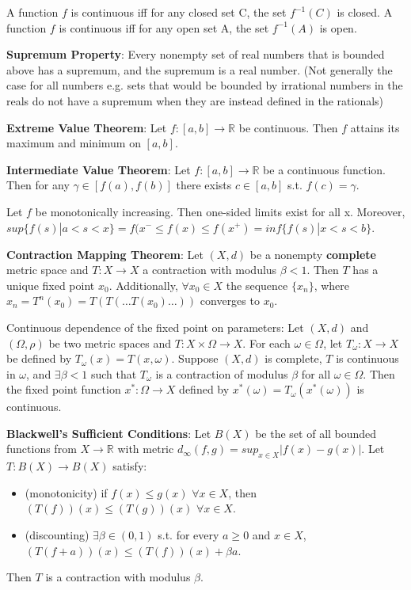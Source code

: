 \documentclass[11pt]{article} %
\begin{document}
A function $f$ is continuous iff for any closed set C, the set $f^{-1}(C)$ is closed. A function $f$ is continuous iff for any open set A, the set $f^{-1}(A)$ is open.

\textbf{Supremum Property}: Every nonempty set of real numbers that is bounded above has a supremum, and the supremum is a real number. (Not generally the case for all numbers e.g. sets that would be bounded by irrational numbers in the reals do not have a supremum when they are instead defined in the rationals)

\textbf{Extreme Value Theorem}: Let $f:[a,b]\rightarrow \mathbb{R}$ be continuous. Then $f$ attains its maximum and minimum on $[a,b]$.

\textbf{Intermediate Value Theorem}: Let $f:[a,b]\rightarrow \mathbb{R}$ be a continuous function. Then for any $\gamma \in [f(a),f(b)]$ there exists $c \in [a,b]$ s.t. $f(c) = \gamma$.

Let $f$ be monotonically increasing. Then one-sided limits exist for all x. Moreover, $sup\{f(s)|a<s<x\} = f(x^{-} \leq f(x) \leq f(x^{+}) = inf\{ f(s)|x<s<b\}$.

\textbf{Contraction Mapping Theorem}: Let $(X,d)$ be a nonempty \textbf{complete} metric space and $T:X \rightarrow X$ a contraction with modulus $\beta<1$. Then $T$ has a unique fixed point $x_0$. Additionally, $\forall x_0 \in X$ the sequence $\{ x_n\}$, where $x_n = T^n(x_0) = T(T(\dots T(x_0)\dots ))$ converges to $x_0$.

Continuous dependence of the fixed point on parameters: Let $(X,d)$ and $(\Omega,\rho)$ be two metric spaces and $T:X \times \Omega \rightarrow X.$ For each $\omega \in \Omega$, let $T_{\omega}: X \rightarrow X$ be defined by $T_{\omega}(x) = T(x,\omega)$. Suppose $(X,d)$ is complete, $T$ is continuous in $\omega$, and $\exists \beta < 1$ such that $T_{\omega}$ is a contraction of modulus $\beta$ for all $\omega \in \Omega.$ Then the fixed point function $x^* : \Omega \rightarrow X$ defined by $x^*(\omega) = T_{\omega}(x^*(\omega))$ is continuous.

\textbf{Blackwell's Sufficient Conditions}: Let $B(X)$ be the set of all bounded functions from $X \rightarrow \mathbb{R}$ with metric $d_{\infty}(f,g) = sup_{x\in X} |f(x) - g(x)|$. Let $T:B(X) \rightarrow B(X)$ satisfy:
\begin{itemize}
\item (monotonicity) if $f(x) \leq g(x)$ $\forall x \in X$, then $(T(f))(x) \leq (T(g))(x)$ $\forall x \in X$.
\item (discounting) $\exists \beta \in (0,1)$ s.t. for every $a \geq 0$ and $x \in X$, $(T(f+a))(x) \leq (T(f))(x) + \beta a$.
\end{itemize}
Then $T$ is a contraction with modulus $\beta$.
\end{document}
